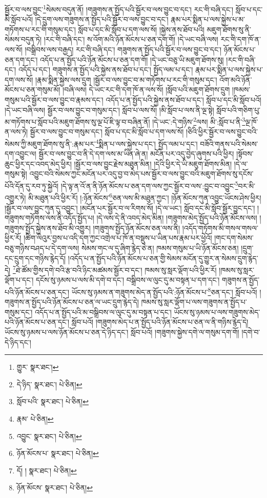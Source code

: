 སྦྱོར་བ་ལས་བྱུང་\footnote{གྱུར་  སྣར་ཐང་། }སེམས་བདུན་ནོ། །གཟུགས་ན་སྤྱོད་པའི་སྦྱོར་བ་ལས་བྱུང་བ་དང་། རང་གི་བཞི་དང་། སློབ་པ་དང་མི་སློབ་པའོ། །དེ་དྲུག་ལས་གཟུགས་ན་སྤྱོད་པའི་སྦྱོར་བ་ལས་བྱུང་བ་དང་། རྣམ་པར་སྨིན་པ་ལས་སྐྱེས་པ་མ་གཏོགས་པ་རང་གི་གསུམ་དང་། སློབ་པ་དང་མི་སློབ་པ་དག་ལས་སོ། །སྐྱེས་ནས་ཐོབ་པའི། མཇུག་ཐོགས་སུ་ནི་སེམས་བདུན་ཏེ། །རང་གི་བཞི་དང་། ས་འོག་མའི་ཉོན་མོངས་པ་ཅན་དག་གོ། །དེ་ཡང་བཞི་ལས། རང་གི་དག་ཁོ་ན་ལས་སོ། །བསྒྲིབས་ལས་བརྒྱད། རང་གི་བཞི་དང་། གཟུགས་ན་སྤྱོད་པའི་སྦྱོར་བ་ལས་བྱུང་བ་དང་། ཉོན་མོངས་པ་ཅན་དག་དང་། འདོད་པ་ན་སྤྱོད་པའི་ཉོན་མོངས་པ་ཅན་དག་གོ། །དེ་ཡང་བཅུ་ཡི་མཇུག་ཐོགས་སུ། །རང་གི་བཞི་དང་། འདོད་པ་དང་། གཟུགས་ན་སྤྱོད་པའི་སྐྱེས་ནས་ཐོབ་པ་དང་། སྤྱོད་ལམ་པ་དང་། རྣམ་པར་སྨིན་པ་ལས་སྐྱེས་པ་དག་ལས་སོ། །རྣམ་སྨིན་སྐྱེས་ལས་དྲུག །སྦྱོར་བ་ལས་བྱུང་བ་མ་གཏོགས་པ་རང་གི་གསུམ་དང་། འོག་མའི་ཉོན་མོངས་པ་ཅན་གསུམ་མོ། །བཞི་ལས། དེ་ཡང་རང་གི་དག་ཁོ་ན་ལས་སོ། །སློབ་པའི་མཇུག་ཐོགས་དྲུག །ཁམས་གསུམ་པའི་སྦྱོར་བ་ལས་བྱུང་བ་རྣམས་དང་། འདོད་པ་ན་སྤྱོད་པའི་སྐྱེས་ནས་ཐོབ་པ་དང་། སློབ་པ་དང་མི་སློབ་པའོ། །དེ་ཡང་བཞི་ལས། སྦྱོར་བ་ལས་བྱུང་བ་གསུམ་དང་། སློབ་པ་ལས་སོ། །མི་སློབ་པ་ལས་ནི་ལྔ་སྟེ། སློབ་པའི་གཅིག་པུ་མ་གཏོགས་པ་སློབ་པའི་མཇུག་ཐོགས་སུ་ལྔ་པོ་ཇི་ལྟ་བ་བཞིན་ནོ། །དེ་ཡང་:དེ་གཉིས་\footnote{དེ་ཉིད་  སྣར་ཐང་།  པེ་ཅིན། }ལས། མི་:སློབ་པ་ནི་\footnote{སློབ་པའི་  སྣར་ཐང་།  པེ་ཅིན། }ལྔ་ཁོ་ན་ལས་ཏེ། སྦྱོར་བ་ལས་བྱུང་བ་གསུམ་དང་། སློབ་པ་དང་མི་སློབ་པ་དག་ལས་སོ། །ཅིའི་ཕྱིར་སྦྱོར་བ་ལས་བྱུང་བའི་སེམས་ཀྱི་མཇུག་ཐོགས་སུ་ནི་:རྣམ་པར་\footnote{རྣམ་  པེ་ཅིན། }སྨིན་པ་ལས་སྐྱེས་པ་དང་། སྤྱོད་ལམ་པ་དང་། བཟོའི་གནས་པའི་སེམས་དག་འབྱུང་ལ། སྦྱོར་བ་ལས་བྱུང་བ་ནི་དེ་དག་ལས་མ་ཡིན་ཞེ་ན། མངོན་པར་འདུ་བྱེད་ཞུགས་པའི་ཕྱིར། །སྟོབས་ཆུང་ཕྱིར་དང་འབད་མེད་ཕྱིར། །སྦྱོར་བ་ལས་བྱུང་རྗེས་མཐུན་མིན། །དེའི་ཕྱིར་དེ་ཡི་མཇུག་ཐོགས་མིན། །དེ་ལ་གསུམ་སྟེ། འབྱུང་བའི་སེམས་ཀྱང་མངོན་པར་འདུ་བྱ་བ་མེད་པས་སྦྱོར་བ་ལས་བྱུང་བའི་མཇུག་ཐོགས་སུ་དངོས་པོའི་དོན་དུ་རབ་ཏུ་སྐྱེའོ། །དེ་ལྟ་ན་འོ་ན་ནི་ཉོན་མོངས་པ་ཅན་དག་ལས་ཀྱང་སྦྱོར་བ་ལས་:བྱུང་བ་འབྱུང་\footnote{འབྱུང་  སྣར་ཐང་།  པེ་ཅིན། }བར་མི་འགྱུར་ཏེ། མི་མཐུན་པའི་ཕྱིར་རོ། །:ཉོན་མོངས་\footnote{ཉོན་མོངས་པ་  སྣར་ཐང་།  པེ་ཅིན། }ཅན་ལས་མི་མཐུན་ཀྱང་། །ཉོན་མོངས་ཀུན་འབྱུང་ཡོངས་ཤེས་ཕྱིར། །སྦྱོར་བ་ལས་བྱུང་ཀུན་དུ་འབྱུང་། །མངོན་པར་སྦྱོར་བ་ལ་རིགས་སོ། །དེ་ལ་ཡང་། སློབ་དང་མི་སློབ་སྦྱོར་བྱུང་དང་། །གཟུགས་གཏོགས་ལས་ནི་འདོད་སྤྱོད་པ། །དེ་ལས་དེ་ནི་འབད་མེད་མིན། །གཟུགས་མེད་སྤྱོད་པའི་ཉོན་མོངས་ལས། །གཟུགས་སྤྱོད་སྐྱེས་ནས་ཐོབ་མི་འགྱུར། །གཟུགས་སྤྱོད་ཉོན་མོངས་ཅན་ལས་ནི། །འདོད་གཏོགས་མི་གསལ་གསལ་ཕྱིར་རོ། །ཚིག་ལེའུར་བྱས་པ་འདི་དག་ཀྱང་འགྲེལ་པ་ཁོ་ན་བསྡུས་པ་ཡིན་པས་རྣམ་པར་ཕྱེའོ། །གང་དག་སེམས་བཅུ་གཉིས་བཤད་པ་དེ་དག་ལས། སེམས་གང་ལ་དུ་ཞིག་རྙེད་ཅེ་ན། ཁམས་གསུམ་པ་ཡི་ཉོན་མོངས་ཅན། །དྲུག་དང་དྲུག་དང་གཉིས་རྙེད་དོ། །འདོད་པ་ན་སྤྱོད་པའི་ཉོན་མོངས་པ་ཅན་གྱི་སེམས་མངོན་དུ་གྱུར་ན་སེམས་དྲུག་རྙེད་དེ། \footnote{དོ། །   སྣར་ཐང་།  པེ་ཅིན། }ཐེ་ཚོམ་གྱིས་དགེ་བའི་རྩ་བའི་ཉིང་མཚམས་སྦྱོར་བ་དང་། ཁམས་སུ་སླར་ལྡོག་པའི་ཕྱིར་རོ། །ཁམས་སུ་སླར་ལྡོག་པ་དང་། དངོས་སུ་ཉམས་པ་ལས་མི་དགེ་བ་དང་། བསྒྲིབས་ལ་ལུང་དུ་མ་བསྟན་པ་དག་དང་། གཟུགས་ན་སྤྱོད་པའི་ཉོན་མོངས་པ་ཅན་དང་། ཡོངས་སུ་ཉམས་ན་གཟུགས་མེད་ན་སྤྱོད་པའི་:ཉོན་མོངས་པ་\footnote{ཉོན་མོངས་  སྣར་ཐང་།  པེ་ཅིན། }ཅན་དང་། སློབ་པའོ། །གཟུགས་ན་སྤྱོད་པའི་ཉོན་མོངས་པ་ཅན་ལ་ཡང་དྲུག་རྙེད་དེ། ཁམས་སུ་སླར་ལྡོག་པ་ལས་གཟུགས་ན་སྤྱོད་པ་གསུམ་དང་། འདོད་པ་ན་སྤྱོད་པའི་མ་བསྒྲིབས་ལ་ལུང་དུ་མ་བསྟན་པ་དང་། ཡོངས་སུ་ཉམས་པ་ལས་གཟུགས་མེད་པའི་ཉོན་མོངས་པ་ཅན་དང་། སློབ་པའོ། །གཟུགས་མེད་པ་ན་སྤྱོད་པའི་ཉོན་མོངས་པ་ཅན་ལ་ནི་གཉིས་རྙེད་དེ། ཡོངས་སུ་ཉམས་པ་ལས་ཉོན་མོངས་པ་ཅན་དེ་ཉིད་དང་། སློབ་པའོ། །གཟུགས་སྐྱེས་དགེ་ལ་གསུམ་དག་གོ། །དགེ་བ་དེ་ཉིད་དང་། 